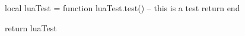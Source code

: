 
\startsection[title=JoyLoL's parser]

\startJoyLoLWord[parseJoyLoL]

\preDataStack[][]

\preProcessStack[][]

\startJoyLoLCode

\stopJoyLoLCode

\startLuaCode

local luaTest = { }
function luaTest.test()
  -- this is a test
  return { }
end

return luaTest

\stopLuaCode

\postDataStack[]

\postProcessStack[]

\stopJoyLoLWord

\stopsection